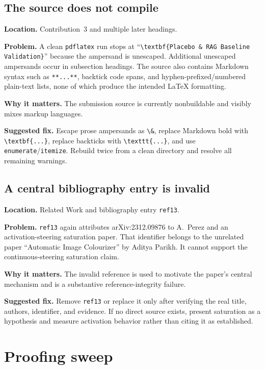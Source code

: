 \documentclass[11pt]{article}
\newcommand{\findinglabel}[1]{\textbf{#1}}
\begin{document}
\subsection*{The source does not compile}

\findinglabel{Location.} Contribution~3 and multiple later headings.

\findinglabel{Problem.} A clean \texttt{pdflatex} run stops at ``\verb|\textbf{Placebo & RAG Baseline Validation}|'' because the ampersand is unescaped.  Additional unescaped ampersands occur in subsection headings.  The source also contains Markdown syntax such as \verb|**...**|, backtick code spans, and hyphen-prefixed/numbered plain-text lists, none of which produce the intended LaTeX formatting.

\findinglabel{Why it matters.} The submission source is currently nonbuildable and visibly mixes markup languages.

\findinglabel{Suggested fix.} Escape prose ampersands as \verb|\&|, replace Markdown bold with \verb|\textbf{...}|, replace backticks with \verb|\texttt{...}|, and use \texttt{enumerate}/\texttt{itemize}.  Rebuild twice from a clean directory and resolve all remaining warnings.

\subsection*{A central bibliography entry is invalid}

\findinglabel{Location.} Related Work and bibliography entry \texttt{ref13}.

\findinglabel{Problem.} \texttt{ref13} again attributes arXiv:2312.09876 to A.~Perez and an activation-steering saturation paper.  That identifier belongs to the unrelated paper ``Automatic Image Colourizer'' by Aditya Parikh.  It cannot support the continuous-steering saturation claim.

\findinglabel{Why it matters.} The invalid reference is used to motivate the paper's central mechanism and is a substantive reference-integrity failure.

\findinglabel{Suggested fix.} Remove \texttt{ref13} or replace it only after verifying the real title, authors, identifier, and evidence.  If no direct source exists, present saturation as a hypothesis and measure activation behavior rather than citing it as established.

\section*{Proofing sweep}
\end{document}
